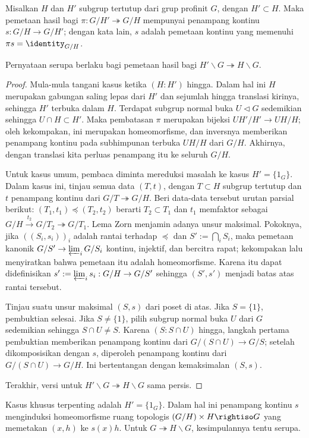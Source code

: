 \begin{lemma}\label{prop:profinite-section}
	Misalkan $H$ dan $H'$ subgrup tertutup dari grup profinit $G$, dengan $H' \subset H$. Maka pemetaan hasil bagi $\pi: G/H' \twoheadrightarrow G/H$ mempunyai penampang kontinu $s: G/H \to G/H'$; dengan kata lain, $s$ adalah pemetaan kontinu yang memenuhi $\pi s = \identity_{G/H}$.
	
	Pernyataan serupa berlaku bagi pemetaan hasil bagi $H' \backslash G \twoheadrightarrow H \backslash G$.
\end{lemma}
\begin{proof}
	Mula-mula tangani kasus ketika $(H:H')$ hingga. Dalam hal ini $H$ merupakan gabungan saling lepas dari $H'$ dan sejumlah hingga translasi kirinya, sehingga $H'$ terbuka dalam $H$. Terdapat subgrup normal buka $U \lhd G$ sedemikian sehingga $U \cap H \subset H'$. Maka pembatasan $\pi$ merupakan bijeksi $UH'/H' \to UH/H$; oleh kekompakan, ini merupakan homeomorfisme, dan inversnya memberikan penampang kontinu pada subhimpunan terbuka $UH/H$ dari $G/H$. Akhirnya, dengan translasi kita perluas penampang itu ke seluruh $G/H$.
	
	Untuk kasus umum, pembaca diminta mereduksi masalah ke kasus $H' = \{1_G\}$. Dalam kasus ini, tinjau semua data $(T,t)$, dengan $T \subset H$ subgrup tertutup dan $t$ penampang kontinu dari $G/T \twoheadrightarrow G/H$. Beri data-data tersebut urutan parsial berikut: $(T_1,t_1) \preceq (T_2,t_2)$ berarti $T_2 \subset T_1$ dan $t_1$ memfaktor sebagai $G/H \xrightarrow{t_2} G/T_2 \twoheadrightarrow G/T_1$. Lema Zorn menjamin adanya unsur maksimal. Pokoknya, jika $((S_i,s_i))_i$ adalah rantai terhadap $\preceq$ dan $S' := \bigcap_i S_i$, maka pemetaan kanonik $G/S' \to \varprojlim_i G/S_i$ kontinu, injektif, dan bercitra rapat; kekompakan lalu menyiratkan bahwa pemetaan itu adalah homeomorfisme. Karena itu dapat didefinisikan $s' := \varprojlim_i s_i: G/H \to G/S'$ sehingga $(S',s')$ menjadi batas atas rantai tersebut.
	
	Tinjau suatu unsur maksimal $(S,s)$ dari poset di atas. Jika $S=\{1\}$, pembuktian selesai. Jika $S \neq \{1\}$, pilih subgrup normal buka $U$ dari $G$ sedemikian sehingga $S \cap U \neq S$. Karena $(S:S\cap U)$ hingga, langkah pertama pembuktian memberikan penampang kontinu dari $G/(S\cap U) \to G/S$; setelah dikomposisikan dengan $s$, diperoleh penampang kontinu dari $G/(S\cap U) \to G/H$. Ini bertentangan dengan kemaksimalan $(S,s)$.
	
	Terakhir, versi untuk $H' \backslash G \twoheadrightarrow H \backslash G$ sama persis.
\end{proof}

Kasus khusus terpenting adalah $H'=\{1_G\}$. Dalam hal ini penampang kontinu $s$ menginduksi homeomorfisme ruang topologis $(G/H) \times H \rightiso G$ yang memetakan $(x,h)$ ke $s(x)h$. Untuk $G \twoheadrightarrow H \backslash G$, kesimpulannya tentu serupa.
